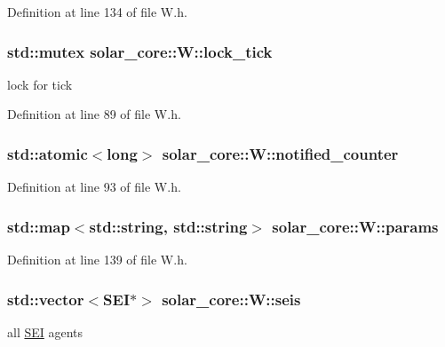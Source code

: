 Definition at line 134 of file W.\+h.

\hypertarget{classsolar__core_1_1_w_a56ba20ee51f5db7288e55bb65f12511b}{}
\subsubsection[{lock\+\_\+tick}]{\setlength{\rightskip}{0pt plus 5cm}std\+::mutex solar\+\_\+core\+::\+W\+::lock\+\_\+tick}\label{classsolar__core_1_1_w_a56ba20ee51f5db7288e55bb65f12511b}
lock for tick 

Definition at line 89 of file W.\+h.

\hypertarget{classsolar__core_1_1_w_afee32d515534826a60ddf12936f85a3d}{}
\subsubsection[{notified\+\_\+counter}]{\setlength{\rightskip}{0pt plus 5cm}std\+::atomic$<$long$>$ solar\+\_\+core\+::\+W\+::notified\+\_\+counter}\label{classsolar__core_1_1_w_afee32d515534826a60ddf12936f85a3d}


Definition at line 93 of file W.\+h.

\hypertarget{classsolar__core_1_1_w_a0d06bc7242f8b3958986118eb217583f}{}
\subsubsection[{params}]{\setlength{\rightskip}{0pt plus 5cm}std\+::map$<$std\+::string, std\+::string$>$ solar\+\_\+core\+::\+W\+::params\hspace{0.3cm}{\ttfamily [protected]}}\label{classsolar__core_1_1_w_a0d06bc7242f8b3958986118eb217583f}


Definition at line 139 of file W.\+h.

\hypertarget{classsolar__core_1_1_w_a311baa30390494ae8e79f26e372e716d}{}
\subsubsection[{seis}]{\setlength{\rightskip}{0pt plus 5cm}std\+::vector$<${\bf S\+E\+I}$\ast$$>$ solar\+\_\+core\+::\+W\+::seis\hspace{0.3cm}{\ttfamily [protected]}}\label{classsolar__core_1_1_w_a311baa30390494ae8e79f26e372e716d}
all \hyperlink{classsolar__core_1_1_s_e_i}{S\+E\+I} agents 

